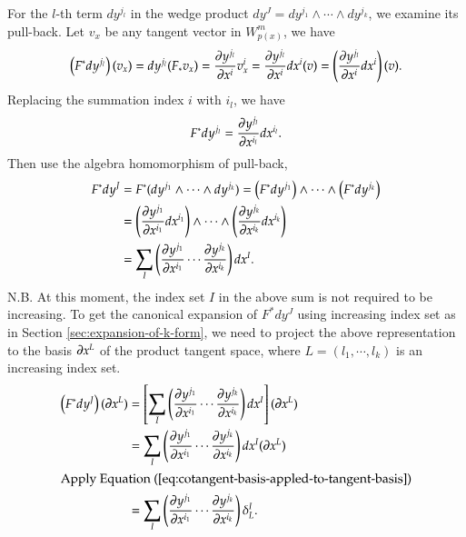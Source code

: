 \documentclass[11pt, a4paper]{book}
\begin{document}
\begin{Proof}
  For the $l$-th term $dy^{j_{l}}$ in the wedge
  product $dy^J = dy^{j_1} \wedge \cdots \wedge dy^{j_k}$, we examine its pull-back. Let
  $v_x$ be any tangent vector in $W_{p(x)}^m$, we have
  \begin{equation*}
    \left( F^{*} dy^{j_l} \right)(v_x) = dy^{j_l}(F_{*} v_x) = \frac{\partial y^{j_l}}{\partial
      x^i} v_x^i = \frac{\partial y^{j_l}}{\partial x^i} dx^i(v) = \left( \frac{\partial
        y^{j_l}}{\partial x^i} dx^i \right)(v).
  \end{equation*}
  Replacing the summation index $i$ with $i_l$, we have
  \begin{equation}
    \label{eq:pullback-of-one-basis}
    F^{*}dy^{j_l} = \frac{\partial y^{j_l}}{\partial x^{i_l}} dx^{i_l}.
  \end{equation}
  Then use the algebra homomorphism of pull-back,
  \begin{align*}
    F^{*}dy^J
    &= F^{*}(dy^{j_1} \wedge \cdots \wedge dy^{j_k}) = \left( F^{*}dy^{j_1}
      \right) \wedge \cdots \wedge \left( F^{*}dy^{j_k} \right) \\
    &= \left(
      \frac{\partial y^{j_1}}{\partial x^{i_1}} dx^{i_1} \right) \wedge \cdots \wedge \left(
      \frac{\partial y^{j_k}}{\partial x^{i_k}} dx^{i_k} \right) \\
    &= \sum_I \left( \frac{\partial y^{j_1}}{\partial x^{i_1}} \cdots \frac{\partial
      y^{j_k}}{\partial x^{i_k}} \right) dx^I.
  \end{align*}
  N.B. At this moment, the index set $I$ in the above sum is not required to be
  increasing. To get the canonical expansion of $F^{*}dy^J$ using increasing index set as
  in Section \ref{sec:expansion-of-k-form}, we need to project the above representation to
  the basis $\boldsymbol{\partial}x^L$ of the product tangent space, where $L=(l_1,\cdots,l_k)$ is
  an increasing index set.
  \begin{align*}
    \left( F^{*}dy^J \right)(\vect{\pdiff}x^L)
    &= \left[ \sum_I \left( \frac{\pdiff
      y^{j_1}}{\pdiff x^{i_1}} \cdots \frac{\pdiff
      y^{j_k}}{\pdiff x^{i_k}} \right) dx^I \right](\vect{\pdiff}x^L) \\
    &= \sum_I \left( \frac{\pdiff y^{j_1}}{\pdiff x^{i_1}} \cdots \frac{\pdiff
      y^{j_k}}{\pdiff x^{i_k}} \right) dx^I(\vect{\pdiff}x^L) \\
    \intertext{Apply Equation (\ref{eq:cotangent-basis-appled-to-tangent-basis})}
    &= \sum_I \left( \frac{\pdiff y^{j_1}}{\pdiff x^{i_1}} \cdots \frac{\pdiff
      y^{j_k}}{\pdiff x^{i_k}} \right) \delta_L^I.

\end{align*}
\end{Proof}
\end{document}
